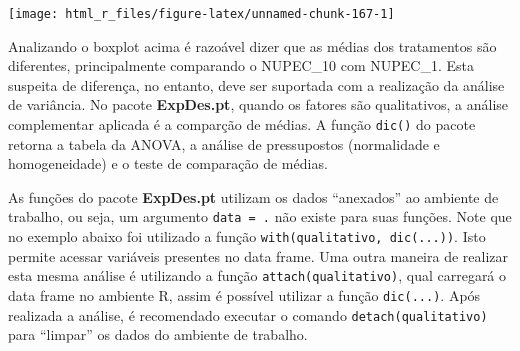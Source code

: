 \documentclass[
]{book}
\begin{document}
\begin{center}\texttt{[image: html\_r\_files/figure-latex/unnamed-chunk-167-1]} \end{center}

 

Analizando o boxplot acima é razoável dizer que as médias dos tratamentos são diferentes, principalmente comparando o NUPEC\_10 com NUPEC\_1. Esta suspeita de diferença, no entanto, deve ser suportada com a realização da análise de variância. No pacote \textbf{ExpDes.pt}, quando os fatores são qualitativos, a análise complementar aplicada é a comparção de médias. A função \texttt{dic()} do pacote retorna a tabela da ANOVA, a análise de pressupostos  (normalidade e homogeneidade) e o teste de comparação de médias.


\begin{dica}
As funções do pacote \textbf{ExpDes.pt} utilizam os dados ``anexados'' ao ambiente de trabalho, ou seja, um argumento \texttt{data\ =\ .} não existe para suas funções. Note que no exemplo abaixo foi utilizado a função \texttt{with(qualitativo,\ dic(...))}. Isto permite acessar variáveis presentes no data frame. Uma outra maneira de realizar esta mesma análise é utilizando a função \texttt{attach(qualitativo)}, qual carregará o data frame no ambiente R, assim é possível utilizar a função \texttt{dic(...)}. Após realizada a análise, é recomendado executar o comando \texttt{detach(qualitativo)} para ``limpar'' os dados do ambiente de trabalho.
\end{dica}
\end{document}
